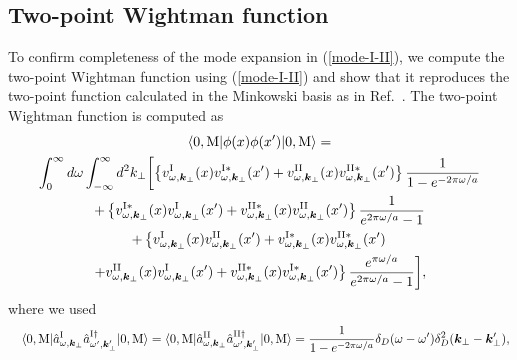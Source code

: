 \documentclass[aps,prd,preprintnumbers,nofootinbib,showpacs,11pt]{revtex4}%
\begin{document}
\begin{widetext}
\subsection{Two-point Wightman function \label{Sec:2pointWightman} }
To confirm completeness of the mode expansion in (\ref{mode-I-II}), 
we compute the two-point Wightman function using (\ref{mode-I-II}) and show that it reproduces
the two-point function calculated in the Minkowski basis as in Ref.~\cite{Higuchi}.
The two-point Wightman function is computed as
\begin{multline}
\langle0,{\rm M}|\phi(x)\phi(x')|0,{\rm M}\rangle=\\
\int_0^\infty d\omega\int_{-\infty}^{\infty} 
d^2 k_\perp \biggl[\left\{
v_{\omega,{\bm k}_\perp}^{\rm I}(x)v_{\omega,{\bm k}_\perp}^{\rm I*}(x')
+v_{\omega,{\bm k}_\perp}^{\rm II}(x)v_{\omega,{\bm k}_\perp}^{\rm II*}(x')
\right\}{1\over 1-e^{-2\pi\omega/a}}
\\
+\left\{
v_{\omega,{\bm k}_\perp}^{\rm I*}(x)v_{\omega,{\bm k}_\perp}^{\rm I}(x')
+v_{\omega,{\bm k}_\perp}^{\rm II*}(x)v_{\omega,{\bm k}_\perp}^{\rm II}(x')
\right\}{1\over e^{2\pi\omega/a}-1}
\\
+\left\{
v_{\omega,{\bm k}_\perp}^{\rm I}(x)v_{\omega,{\bm k}_\perp}^{\rm II}(x')
+v_{\omega,{\bm k}_\perp}^{\rm I*}(x)v_{\omega,{\bm k}_\perp}^{\rm II*}(x')\right.
\\
\left.+
v_{\omega,{\bm k}_\perp}^{\rm II}(x)v_{\omega,{\bm k}_\perp}^{\rm I}(x')
+v_{\omega,{\bm k}_\perp}^{\rm II*}(x)v_{\omega,{\bm k}_\perp}^{\rm I*}(x')
\right\}{e^{\pi\omega/a}\over e^{2\pi\omega/a}-1}\biggr],
\end{multline}
where we used
\begin{eqnarray}
&& \langle0,{\rm M}|\hat a_{\omega,{\bm k}_\perp}^{\rm I}\hat a_{\omega',{\bm k}_\perp'}^{\rm I \dagger}|0,{\rm M}\rangle
=\langle0,{\rm M}|\hat a_{\omega,{\bm k}_\perp}^{\rm II}\hat a_{\omega',{\bm k}_\perp'}^{\rm II \dagger}|0,{\rm M}\rangle
={1\over 1- e^{-2\pi\omega/a} }\delta_D(\omega-\omega')\delta_D^2(\bm k_\perp-\bm k_\perp'),

\end{eqnarray}
\end{widetext}
\end{document}
